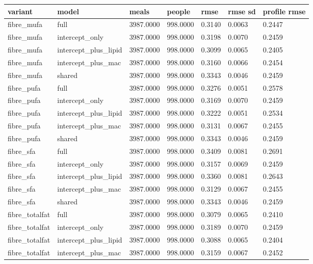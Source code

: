 {\footnotesize\setlength{\tabcolsep}{3pt}
\begin{longtable}{lllllll}
\toprule
\textbf{variant} & \textbf{model} & \textbf{meals} & \textbf{people} & \textbf{rmse} & \textbf{rmse sd} & \textbf{profile rmse} \\
\midrule
\endhead
fibre\_mufa & full & 3987.0000 & 998.0000 & 0.3140 & 0.0063 & 0.2447 \\
fibre\_mufa & intercept\_only & 3987.0000 & 998.0000 & 0.3198 & 0.0070 & 0.2459 \\
fibre\_mufa & intercept\_plus\_lipid & 3987.0000 & 998.0000 & 0.3099 & 0.0065 & 0.2405 \\
fibre\_mufa & intercept\_plus\_mac & 3987.0000 & 998.0000 & 0.3160 & 0.0066 & 0.2454 \\
fibre\_mufa & shared & 3987.0000 & 998.0000 & 0.3343 & 0.0046 & 0.2459 \\
fibre\_pufa & full & 3987.0000 & 998.0000 & 0.3276 & 0.0051 & 0.2578 \\
fibre\_pufa & intercept\_only & 3987.0000 & 998.0000 & 0.3169 & 0.0070 & 0.2459 \\
fibre\_pufa & intercept\_plus\_lipid & 3987.0000 & 998.0000 & 0.3222 & 0.0051 & 0.2534 \\
fibre\_pufa & intercept\_plus\_mac & 3987.0000 & 998.0000 & 0.3131 & 0.0067 & 0.2455 \\
fibre\_pufa & shared & 3987.0000 & 998.0000 & 0.3343 & 0.0046 & 0.2459 \\
fibre\_sfa & full & 3987.0000 & 998.0000 & 0.3409 & 0.0081 & 0.2691 \\
fibre\_sfa & intercept\_only & 3987.0000 & 998.0000 & 0.3157 & 0.0069 & 0.2459 \\
fibre\_sfa & intercept\_plus\_lipid & 3987.0000 & 998.0000 & 0.3360 & 0.0081 & 0.2643 \\
fibre\_sfa & intercept\_plus\_mac & 3987.0000 & 998.0000 & 0.3129 & 0.0067 & 0.2455 \\
fibre\_sfa & shared & 3987.0000 & 998.0000 & 0.3343 & 0.0046 & 0.2459 \\
fibre\_totalfat & full & 3987.0000 & 998.0000 & 0.3079 & 0.0065 & 0.2410 \\
fibre\_totalfat & intercept\_only & 3987.0000 & 998.0000 & 0.3189 & 0.0070 & 0.2459 \\
fibre\_totalfat & intercept\_plus\_lipid & 3987.0000 & 998.0000 & 0.3088 & 0.0065 & 0.2404 \\
fibre\_totalfat & intercept\_plus\_mac & 3987.0000 & 998.0000 & 0.3159 & 0.0067 & 0.2452 \\

\end{longtable}}
